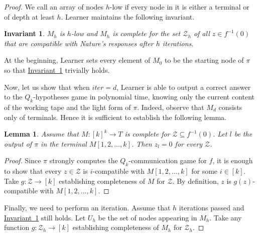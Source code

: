 \documentclass[11pt]{article}
\numberwithin{equation}{section}
\newtheorem{lemma}[theorem]{Lemma}
\theoremstyle{definition}
\theoremstyle{plain}
\newcommand{\expref}[2]{\hyperref[#2]{#1~\ref{#2}}}
\newtheorem{invariant}[theorem]{Invariant}
\begin{document}
\begin{proof}
We call an array of nodes $h$-low if every node in it is either a terminal or of depth at least $h$. Learner maintains the following invariant.
 

\begin{invariant}
\label{invar2}
$M_h$ is $h$-low and $M_h$ is complete for the set $\mathcal{Z}_h$ of all $z\in f^{-1}(0)$ that are compatible with Nature's responses after $h$ iterations.
\end{invariant}

At the beginning, Learner sets every element of  $M_0$ to be the starting node of $\pi$ so that \expref{Invariant}{invar2} trivially holds.

Now, let us show that when $iter = d$, Learner is able to output a correct answer to the $Q_k$-hypotheses game in polynomial time, knowing only the current content of the working tape and the light form of $\pi$. Indeed, observe that $M_d$ consists only of terminals. Hence it is sufficient to establish the following lemma.

\begin{lemma}
\label{complete_lemma_2}
Assume that $M\colon [k]^k \to T$ is complete for $\mathcal{Z}\subseteq f^{-1}(0)$. Let $l$ be the output of $\pi$ in the terminal $M[1, 2, \ldots, k]$. Then $z_l = 0$ for every $\mathcal{Z}$.
\end{lemma}
\begin{proof}
Since $\pi$ strongly computes the $Q_k$-communication game for $f$, it is enough to show that every $z\in\mathcal{Z}$ is $i$-compatible with $M[1, 2, \ldots, k]$ for some $i\in[k]$. Take $g\colon \mathcal{Z} \to [k]$ establishing completeness of $M$ for $\mathcal{Z}$. By definition, $z$ is $g(z)$-compatible with $M[1, 2, \ldots, k]$.
\end{proof}

Finally, we need to perform an iteration. Assume that $h$ iterations passed and \expref{Invariant}{invar2} still holds. Let $U_h$ be the set of nodes appearing in $M_h$. Take any function $g\colon \mathcal{Z}_h \to [k]$ establishing completeness of $M_h$ for $\mathcal{Z}_h$.


\end{proof}
\end{document}
